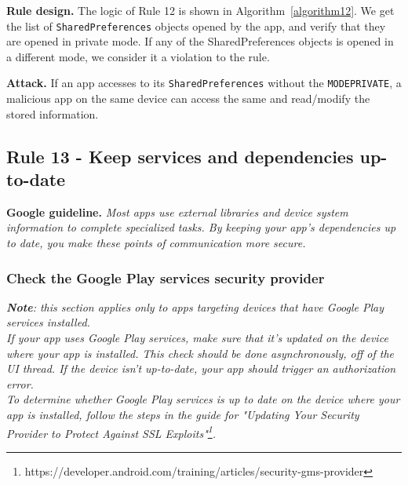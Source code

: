 \textbf{Rule design.} The logic of Rule 12 is shown in Algorithm~\ref{algorithm12}. We get the list of \texttt{SharedPreferences} objects opened by the app, and verify that they are opened in private mode. If any of the SharedPreferences objects is opened in a different mode, we consider it a violation to the rule.

\setcounter{algocf}{11}
\begin{algorithm}[]
\SetAlgoLined
{}
\caption{}
\label{algorithm12}
\end{algorithm}

\textbf{Attack.} If an app accesses to its \texttt{SharedPreferences} without the \texttt{MODE\textunderscore PRIVATE}, a malicious app on the same device can access the same and read/modify the stored information.

\subsection{Rule 13 - Keep services and dependencies up-to-date} 
\textbf{Google guideline.} \emph{Most apps use external libraries and device system information to complete specialized tasks. By keeping your app's dependencies up to date, you make these points of communication more secure.}

\subsubsection{Check the Google Play services security provider}
\emph{\textbf{Note}: this section applies only to apps targeting devices that have \textit{Google Play services} installed.
\\
If your app uses Google Play services, make sure that it's updated on the device where your app is installed. This check should be done asynchronously, off of the UI thread. If the device isn't up-to-date, your app should trigger an authorization error.
\\
To determine whether Google Play services is up to date on the device where your app is installed, follow the steps in the guide for "Updating Your Security Provider to Protect Against SSL Exploits"\footnote{https://developer.android.com/training/articles/security-gms-provider}.}

